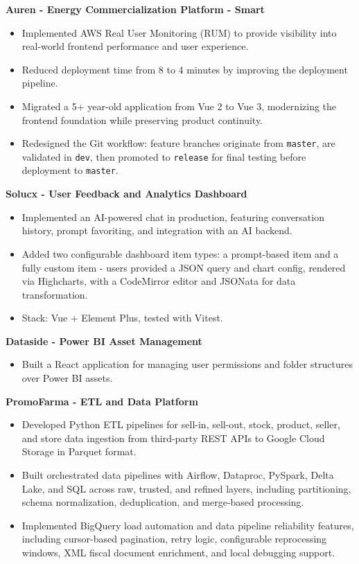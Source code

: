 \documentclass[letterpaper,11pt]{article}
\newcommand{\resumeItem}[1]{
  \item\small{#1 \vspace{-2pt}}
}
\newcommand{\resumeItemListStart}{\begin{itemize}[leftmargin=0.2in]}
\newcommand{\resumeItemListEnd}{\end{itemize}\vspace{-4pt}}
\begin{document}
    \vspace{2pt}
    \textbf{\small Auren - Energy Commercialization Platform - Smart}
    \resumeItemListStart
      \resumeItem{Implemented AWS Real User Monitoring (RUM) to provide visibility into real-world frontend performance and user experience.}
      \resumeItem{Reduced deployment time from 8 to 4 minutes by improving the deployment pipeline.}
      \resumeItem{Migrated a 5+ year-old application from Vue 2 to Vue 3, modernizing the frontend foundation while preserving product continuity.}
      \resumeItem{Redesigned the Git workflow: feature branches originate from \texttt{master}, are validated in \texttt{dev}, then promoted to \texttt{release} for final testing before deployment to \texttt{master}.}
    \resumeItemListEnd

    \vspace{2pt}
    \textbf{\small Solucx - User Feedback and Analytics Dashboard}
    \resumeItemListStart
      \resumeItem{Implemented an AI-powered chat in production, featuring conversation history, prompt favoriting, and integration with an AI backend.}
      \resumeItem{Added two configurable dashboard item types: a prompt-based item and a fully custom item - users provided a JSON query and chart config, rendered via Highcharts, with a CodeMirror editor and JSONata for data transformation.}
      \resumeItem{Stack: Vue + Element Plus, tested with Vitest.}
    \resumeItemListEnd

    \vspace{2pt}
    \textbf{\small Dataside - Power BI Asset Management}
    \resumeItemListStart
      \resumeItem{Built a React application for managing user permissions and folder structures over Power BI assets.}
    \resumeItemListEnd

    \vspace{2pt}
    \textbf{\small PromoFarma - ETL and Data Platform}
    \resumeItemListStart
      \resumeItem{Developed Python ETL pipelines for sell-in, sell-out, stock, product, seller, and store data ingestion from third-party REST APIs to Google Cloud Storage in Parquet format.}
      \resumeItem{Built orchestrated data pipelines with Airflow, Dataproc, PySpark, Delta Lake, and SQL across raw, trusted, and refined layers, including partitioning, schema normalization, deduplication, and merge-based processing.}
      \resumeItem{Implemented BigQuery load automation and data pipeline reliability features, including cursor-based pagination, retry logic, configurable reprocessing windows, XML fiscal document enrichment, and local debugging support.}
    \resumeItemListEnd
\end{document}
